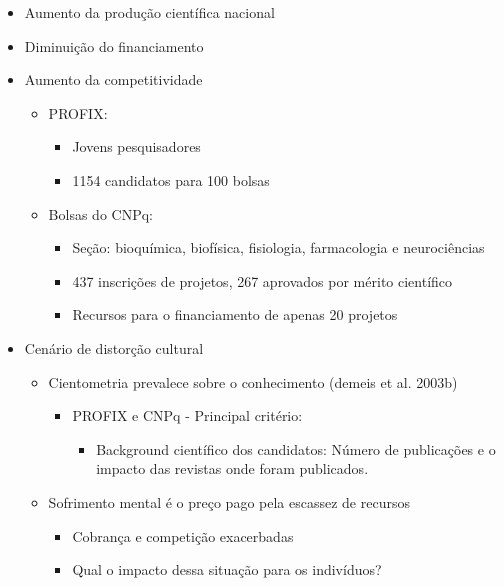 \documentclass[bigger]{beamer}
\begin{document}
\begin{frame}[label={sec:org51ee9d3}]{\cite{demeis2003}}
\begin{itemize}
\item Aumento da produção científica nacional
\item Diminuição do financiamento
\item Aumento da competitividade
\begin{itemize}
\item PROFIX:
\begin{itemize}
\item Jovens pesquisadores
\item 1154 candidatos para 100 bolsas
\end{itemize}
\item Bolsas do CNPq:
\begin{itemize}
\item Seção: bioquímica, biofísica, fisiologia, farmacologia e neurociências
\item 437 inscrições de projetos, 267 aprovados por mérito científico
\item Recursos para o financiamento de apenas 20 projetos
\end{itemize}
\end{itemize}
\item Cenário de distorção cultural
\begin{itemize}
\item Cientometria prevalece sobre o conhecimento (demeis et al. 2003b)
\begin{itemize}
\item PROFIX e CNPq - Principal critério:
\begin{itemize}
\item Background científico dos candidatos: Número de publicações e o impacto das revistas onde foram publicados.
\end{itemize}
\end{itemize}
\item Sofrimento mental é o preço pago pela escassez de recursos
\begin{itemize}
\item Cobrança e competição exacerbadas
\item Qual o impacto dessa situação para os indivíduos?
\end{itemize}
\end{itemize}
\end{itemize}
\end{frame}
\end{document}
